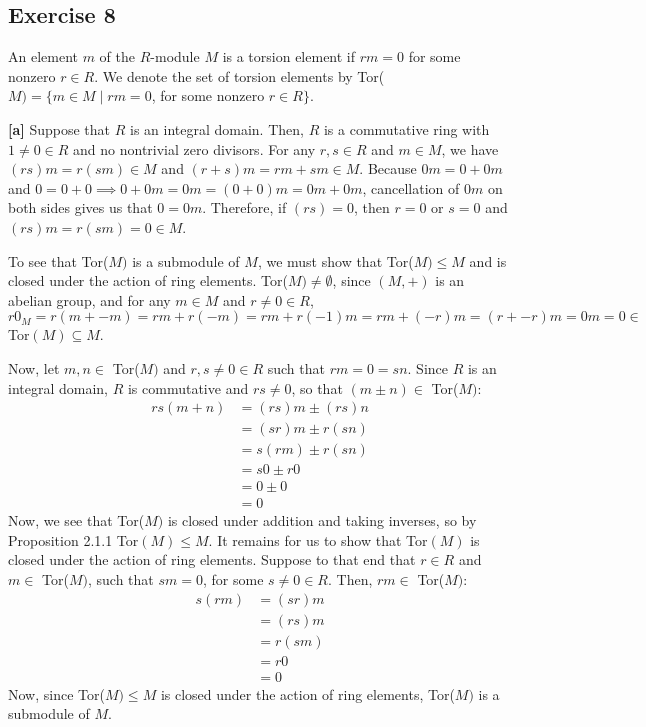 \subsection*{Exercise 8}
An element $m$ of the $R$-module $M$ is a torsion element if $rm = 0$ for some nonzero $r \in R$. We denote the set of torsion elements by Tor($M) = \{ m \in M \mid rm = 0$, for some nonzero $r \in R \}$.

\vspace{5 mm}
\textbf{[a]} Suppose that $R$ is an integral domain. Then, $R$ is a commutative ring with $1 \not= 0 \in R$ and no nontrivial zero divisors. For any $r,s \in R$ and $m \in M$, we have $(rs)m = r(sm) \in M$ and $(r + s)m = rm + sm \in M$. Because $0m = 0 + 0m$ and $0 = 0 + 0 \implies 0 + 0m = 0m = (0 + 0)m = 0m + 0m$, cancellation of $0m$ on both sides gives us that $0 = 0m$. Therefore, if $(rs) = 0$, then $r=0$ or $s=0$ and $(rs)m = r(sm) = 0 \in M$.

To see that Tor($M)$ is a submodule of $M$, we must show that Tor($M) \le M$ and is closed under the action of ring elements. Tor($M) \not= \emptyset$, since $(M,+)$ is an abelian group, and for any $m \in M$ and $r \not= 0 \in R$, $r0_M = r(m + -m)= rm + r(-m) = rm + r(-1)m = rm + (-r)m = (r + -r)m = 0m = 0 \in$ Tor$(M) \subseteq M$.

Now, let $m,n \in$ Tor($M)$ and $r,s \not= 0 \in R$ such that $rm = 0 = sn$. Since $R$ is an integral domain, $R$ is commutative and $rs \not= 0$, so that $(m \pm n) \in$ Tor($M)$:
\begin{align*}
    rs(m+n) &= (rs)m \pm (rs)n \\
    &= (sr)m \pm r(sn) \\
    &= s(rm) \pm r(sn) \\
    &= s0 \pm r0 \\
    &= 0 \pm 0 \\
    &= 0
\end{align*}
Now, we see that Tor($M)$ is closed under addition and taking inverses, so by Proposition 2.1.1 Tor$(M) \le M$. It remains for us to show that Tor$(M)$ is closed under the action of ring elements. Suppose to that end that $r \in R$ and $m \in$ Tor($M)$, such that $sm = 0$, for some $s \not= 0 \in R$. Then, $rm \in$ Tor($M)$:
\begin{align*}
    s(rm) &= (sr)m \\
    &= (rs)m \\
    &= r(sm) \\
    &= r0 \\
    &= 0
\end{align*}
Now, since Tor($M) \le M$ is closed under the action of ring elements, Tor($M)$ is a submodule of $M$.

